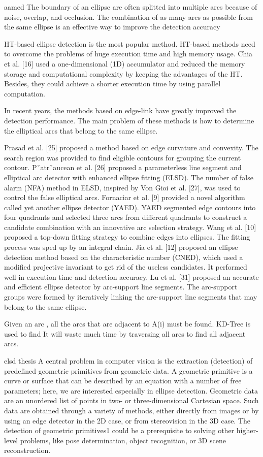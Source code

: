 \documentclass[a4paper]{report}
\begin{document}
aamed
The boundary of an ellipse are often splitted
into multiple arcs because of noise, overlap, and occlusion.
The combination of as many arcs as possible from the same
ellipse is an effective way to improve the detection accuracy

HT-based ellipse detection is the most popular method.
HT-based methods need to overcome the problems of huge
execution time and high memory usage.
Chia et al. [16]
used a one-dimensional (1D) accumulator and reduced the
memory storage and computational complexity by keeping
the advantages of the HT. Besides, they could achieve a
shorter execution time by using parallel computation.

In recent years, the methods based on edge-link have greatly
improved the detection performance. The main problem of
these methods is how to determine the elliptical arcs that
belong to the same ellipse.

Prasad et al. [25] proposed a method
based on edge curvature and convexity. The search region was
provided to find eligible contours for grouping the current
contour. Pˇatrˇaucean et al. [26] proposed a parameterless line
segment and elliptical arc detector with enhanced ellipse fitting
(ELSD). The number of false alarm (NFA) method in ELSD,
inspired by Von Gioi et al. [27], was used to control the false
elliptical arcs. Fornaciar et al. [9] provided a novel algorithm
called yet another ellipse detector (YAED). YAED segmented
edge contours into four quadrants and selected three arcs
from different quadrants to construct a candidate combination
with an innovative arc selection strategy. Wang et al. [10]
proposed a top-down fitting strategy to combine edges into
ellipses. The fitting process was sped up by an integral
chain. Jia et al. [12] proposed an ellipse
detection method based on the characteristic number (CNED),
which used a modified projective invariant to get rid of the
useless candidates. It performed well in execution time and
detection accuracy. Lu et al. [31] proposed an accurate and efficient ellipse detector
by arc-support line segments. The arc-support groups were
formed by iteratively linking the arc-support line segments that
may belong to the same ellipse. 

Given an arc , all the arcs that are adjacent to A(i) must be found. KD-Tree is used to find
It will waste much
time by traversing all arcs to find all adjacent arcs.

elsd thesis
A central problem in computer vision is the extraction (detection) of predefined geometric primitives
from geometric data. A geometric primitive is a curve or surface that can be described
by an equation with a number of free parameters; here, we are interested especially in ellipse
detection. Geometric data are an unordered list of points in two- or three-dimensional Cartesian
space. Such data are obtained through a variety of methods, either directly from images or by
using an edge detector in the 2D case, or from stereovision in the 3D case. The detection of
geometric primitives1 could be a prerequisite to solving other higher-level problems, like pose
determination, object recognition, or 3D scene reconstruction.
\end{document}
